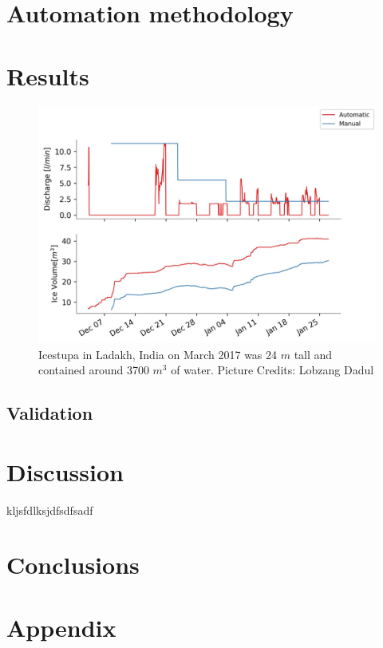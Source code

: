 \documentclass[utf8]{frontiersSCNS}
\begin{document}
\section{Automation methodology}

\section{Results}

\begin{figure}
	\begin{center}
		\includegraphics[width=10 cm]{Figures/autovsmanual.jpg}
	\end{center}
	\caption{Icestupa in Ladakh, India on March 2017 was 24 $m$ tall and contained around 3700 $m^3$
		of water. Picture Credits: Lobzang Dadul}
	\label{fig:old_icestupa}
\end{figure}

\subsection{Validation}

\section{Discussion}
kljsfdlksjdfsdfsadf

\section{Conclusions}

\section{Appendix}
\end{document}
